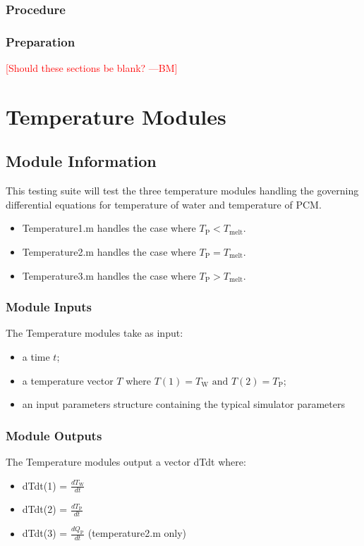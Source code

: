 \documentclass[12pt]{article}
\newcommand{\authornote}[3]{\textcolor{#1}{[#3 ---#2]}}
\newcommand{\authornote}[3]{}
\newcommand{\bmac}[1]{\authornote{red}{BM}{#1}}
\begin{document}
\subsubsection{Procedure}


\subsubsection{Preparation}

\bmac{Should these sections be blank?}

%
%
\section{Temperature Modules}


\subsection{Module Information}
This testing suite will test the three temperature modules handling the governing 
differential equations for temperature of water and temperature of PCM.
\begin{itemize}
\item Temperature1.m handles the case where $T_{\text{P}} < T_{\text{melt}}$.
\item Temperature2.m handles the case where $T_{\text{P}} = T_{\text{melt}}$.
\item Temperature3.m handles the case where $T_{\text{P}} > T_{\text{melt}}$.
\end{itemize}

\subsubsection{Module Inputs}
The Temperature modules take as input:
\begin{itemize}
\item a time $t$;
\item a temperature vector $T$ where $T(1) = T_{\text{W}} \text{ and } 
T(2) = T_{\text{P}}$;
\item an input parameters structure containing the typical simulator parameters
\end{itemize}

\subsubsection{Module Outputs}
The Temperature modules output a vector dTdt where:
\begin{itemize}
\item dTdt(1) = $\frac{dT_{\text{W}}}{dt}$
\item dTdt(2) = $\frac{dT_{\text{P}}}{dt}$
\item dTdt(3) = $\frac{dQ_{\text{P}}}{dt}$ (temperature2.m only)
\end{itemize}
\end{document}
